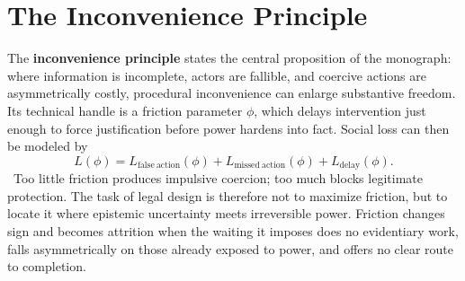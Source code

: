 
\chapter{The Inconvenience Principle}
\label{ch:ch041}

The \textbf{inconvenience principle} states the central proposition of the monograph: where information is incomplete, actors are fallible, and coercive actions are asymmetrically costly, procedural inconvenience can enlarge substantive freedom. Its technical handle is a friction parameter \(\phi\), which delays intervention just enough to force justification before power hardens into fact. Social loss can then be modeled by
\[
L(\phi)
=
L_{\mathrm{false\ action}}(\phi)
+
L_{\mathrm{missed\ action}}(\phi)
+
L_{\mathrm{delay}}(\phi).
\]
\ToyModel\ Too little friction produces impulsive coercion; too much blocks legitimate protection.
The task of legal design is therefore not to maximize friction, but to locate it where epistemic uncertainty meets irreversible power. Friction changes sign and becomes attrition when the waiting it imposes does no evidentiary work, falls asymmetrically on those already exposed to power, and offers no clear route to completion.
